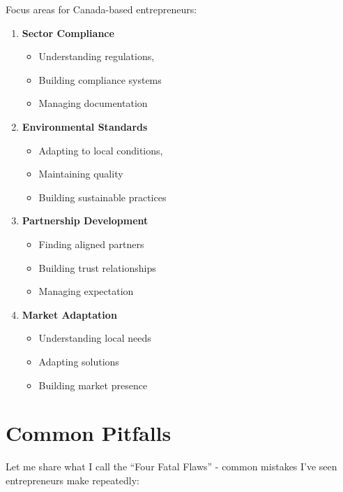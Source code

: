 Focus areas for Canada-based entrepreneurs:

\begin{enumerate}
    \item \textbf{Sector Compliance}
    \begin{itemize}
        \item Understanding regulations,
        \item Building compliance systems
        \item Managing documentation
    \end{itemize}

    \item \textbf{Environmental Standards}
    \begin{itemize}
        \item Adapting to local conditions,
        \item Maintaining quality
        \item Building sustainable practices
    \end{itemize}

    \item \textbf{Partnership Development}
    \begin{itemize}
        \item Finding aligned partners
        \item Building trust relationships
        \item Managing expectation
    \end{itemize}

    \item \textbf{Market Adaptation}
    \begin{itemize}
        \item Understanding local needs
        \item Adapting solutions
        \item Building market presence
    \end{itemize}
\end{enumerate}

\section{Common Pitfalls}\label{sec:common-pitfalls-1}

Let me share what I call the ``Four Fatal Flaws'' - common mistakes I've seen entrepreneurs make repeatedly:

